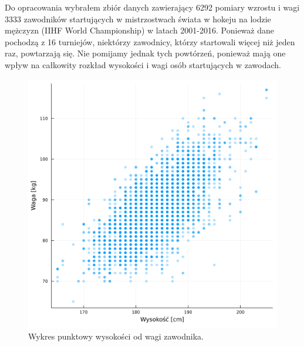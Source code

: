 \documentclass[12pt]{mwart}
\begin{document}
	Do opracowania wybrałem zbiór danych zawierający 6292 pomiary wzrostu i wagi 3333 zawodników startujących w mistrzostwach świata w hokeju na lodzie mężczyzn (IIHF World Championship) w latach 2001-2016. Ponieważ dane pochodzą z 16 turniejów, niektórzy zawodnicy, którzy startowali więcej niż jeden raz, powtarzają się. Nie pomijamy jednak tych powtórzeń, ponieważ mają one wpływ na całkowity rozkład wysokości i wagi osób startujących w zawodach.
	
	\begin{figure}[H]
		\centering
		\includegraphics[scale=0.1]{images/scatter.png}
		\caption{Wykres punktowy wysokości od wagi zawodnika.}
	\end{figure}
	
\end{document}
